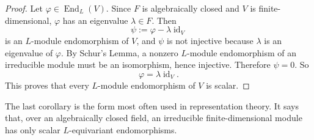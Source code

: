 \begin{proof}
    Let $\varphi\in \operatorname{End}_L(V)$. Since $F$ is algebraically closed and $V$ is finite-dimensional, $\varphi$ has an eigenvalue $\lambda\in F$.
    Then
    \[
        \psi:=\varphi-\lambda \operatorname{id}_V
    \]
    is an $L$-module endomorphism of $V$, and $\psi$ is not injective because $\lambda$ is an eigenvalue of $\varphi$.
    By Schur's Lemma, a nonzero $L$-module endomorphism of an irreducible module must be an isomorphism, hence injective. Therefore $\psi=0$.
    So
    \[
        \varphi=\lambda \operatorname{id}_V.
    \]
    This proves that every $L$-module endomorphism of $V$ is scalar.
\end{proof}

\begin{remark}
    The last corollary is the form most often used in representation theory.
    It says that, over an algebraically closed field, an irreducible finite-dimensional module has only scalar $L$-equivariant endomorphisms.
\end{remark}

